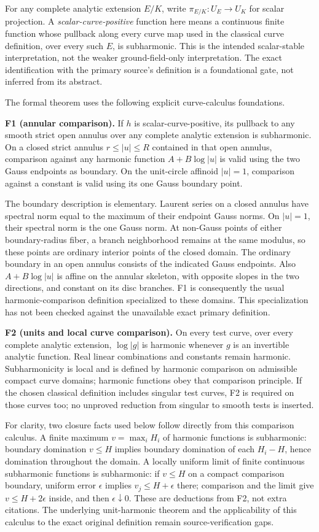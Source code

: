 \documentclass[11pt]{article}
\begin{document}
For any complete analytic extension \(E/K\), write \(\pi_{E/K}:U_E\to U_K\) for scalar projection. A \emph{scalar-curve-positive} function here means a continuous finite function whose pullback along every curve map used in the classical curve definition, over every such \(E\), is subharmonic. This is the intended scalar-stable interpretation, not the weaker ground-field-only interpretation. The exact identification with the primary source's definition is a foundational gate, not inferred from its abstract.

The formal theorem uses the following explicit curve-calculus foundations.

\textbf{F1 (annular comparison).} If \(h\) is scalar-curve-positive, its pullback to any smooth strict open annulus over any complete analytic extension is subharmonic. On a closed strict annulus \(r\leq |u|\leq R\) contained in that open annulus, comparison against any harmonic function \(A+B\log|u|\) is valid using the two Gauss endpoints as boundary. On the unit-circle affinoid \(|u|=1\), comparison against a constant is valid using its one Gauss boundary point.

The boundary description is elementary. Laurent series on a closed annulus have spectral norm equal to the maximum of their endpoint Gauss norms. On \(|u|=1\), their spectral norm is the one Gauss norm. At non-Gauss points of either boundary-radius fiber, a branch neighborhood remains at the same modulus, so these points are ordinary interior points of the closed domain. The ordinary boundary in an open annulus consists of the indicated Gauss endpoints. Also \(A+B\log|u|\) is affine on the annular skeleton, with opposite slopes in the two directions, and constant on its disc branches. F1 is consequently the usual harmonic-comparison definition specialized to these domains. This specialization has not been checked against the unavailable exact primary definition.

\textbf{F2 (units and local curve comparison).} On every test curve, over every complete analytic extension, \(\log|g|\) is harmonic whenever \(g\) is an invertible analytic function. Real linear combinations and constants remain harmonic. Subharmonicity is local and is defined by harmonic comparison on admissible compact curve domains; harmonic functions obey that comparison principle. If the chosen classical definition includes singular test curves, F2 is required on those curves too; no unproved reduction from singular to smooth tests is inserted.

For clarity, two closure facts used below follow directly from this comparison calculus. A finite maximum \(v=\max_i H_i\) of harmonic functions is subharmonic: boundary domination \(v\leq H\) implies boundary domination of each \(H_i-H\), hence domination throughout the domain. A locally uniform limit of finite continuous subharmonic functions is subharmonic: if \(v\leq H\) on a compact comparison boundary, uniform error \(\epsilon\) implies \(v_j\leq H+\epsilon\) there; comparison and the limit give \(v\leq H+2\epsilon\) inside, and then \(\epsilon\downarrow0\). These are deductions from F2, not extra citations. The underlying unit-harmonic theorem and the applicability of this calculus to the exact original definition remain source-verification gaps.
\end{document}
